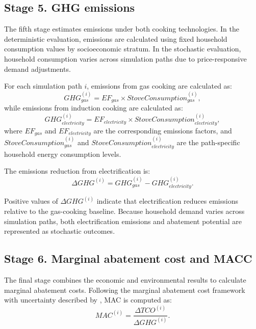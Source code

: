 \documentclass[authoryear,preprint,review,10pt]{elsarticle}
\begin{document}
\subsection{Stage 5. GHG emissions}
\label{sec:ghg_calculation}

The fifth stage estimates emissions under both cooking technologies. In the deterministic evaluation, emissions are calculated using fixed household consumption values by socioeconomic stratum. In the stochastic evaluation, household consumption varies across simulation paths due to price-responsive demand adjustments.

For each simulation path $i$, emissions from gas cooking are calculated as:
\begin{equation}
GHG_{gas}^{(i)} =
EF_{gas} \times StoveConsumption_{gas}^{(i)},
\end{equation}
while emissions from induction cooking are calculated as:
\begin{equation}
GHG_{electricity}^{(i)} =
EF_{electricity} \times StoveConsumption_{electricity}^{(i)},
\end{equation}
where $EF_{gas}$ and $EF_{electricity}$ are the corresponding emissions factors, and $StoveConsumption_{gas}^{(i)}$ and $StoveConsumption_{electricity}^{(i)}$ are the path-specific household energy consumption levels.

The emissions reduction from electrification is:
\begin{equation}
\Delta GHG^{(i)} =
GHG_{gas}^{(i)} - GHG_{electricity}^{(i)}.
\end{equation}

Positive values of $\Delta GHG^{(i)}$ indicate that electrification reduces emissions relative to the gas-cooking baseline. Because household demand varies across simulation paths, both electrification emissions and abatement potential are represented as stochastic outcomes.

\subsection{Stage 6. Marginal abatement cost and MACC}
\label{sec:mac}

The final stage combines the economic and environmental results to calculate marginal abatement costs. Following the marginal abatement cost framework with uncertainty described by \citet{clerc2013desarrollo}, MAC is computed as:
\begin{equation}
MAC^{(i)} = \frac{\Delta TCO^{(i)}}{\Delta GHG^{(i)}}.
\end{equation}
\end{document}
